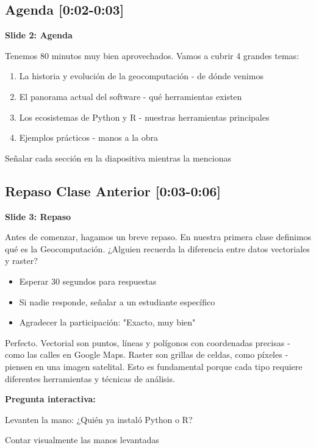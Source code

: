 \documentclass[11pt,a4paper]{article}
\newcommand{\tiempo}[1]{\textcolor{timecolor}{\faIcon{clock} \textbf{[#1]}}}
\newcommand{\decir}[1]{\begin{tcolorbox}[colback=blue!5,colframe=usachblue,title={\faIcon{microphone} DECIR}]#1\end{tcolorbox}}
\newcommand{\hacer}[1]{\begin{tcolorbox}[colback=green!5,colframe=green!50!black,title={\faIcon{hand-point-right} HACER}]#1\end{tcolorbox}}
\newcommand{\nota}[1]{\begin{tcolorbox}[colback=yellow!10,colframe=orange,title={\faIcon{sticky-note} NOTA}]#1\end{tcolorbox}}
\begin{document}
\subsection{Agenda \tiempo{0:02-0:03}}

\textbf{Slide 2: Agenda}

\decir{Tenemos 80 minutos muy bien aprovechados. Vamos a cubrir 4 grandes temas:
\begin{enumerate}
    \item La historia y evolución de la geocomputación - de dónde venimos
    \item El panorama actual del software - qué herramientas existen
    \item Los ecosistemas de Python y R - nuestras herramientas principales
    \item Ejemplos prácticos - manos a la obra
\end{enumerate}
}

\nota{Señalar cada sección en la diapositiva mientras la mencionas}

\subsection{Repaso Clase Anterior \tiempo{0:03-0:06}}

\textbf{Slide 3: Repaso}

\decir{Antes de comenzar, hagamos un breve repaso. En nuestra primera clase definimos qué es la Geocomputación. ¿Alguien recuerda la diferencia entre datos vectoriales y raster?}

\hacer{
\begin{itemize}
    \item Esperar 30 segundos para respuestas
    \item Si nadie responde, señalar a un estudiante específico
    \item Agradecer la participación: "Exacto, muy bien"
\end{itemize}
}

\decir{Perfecto. Vectorial son puntos, líneas y polígonos con coordenadas precisas - como las calles en Google Maps. Raster son grillas de celdas, como píxeles - piensen en una imagen satelital. Esto es fundamental porque cada tipo requiere diferentes herramientas y técnicas de análisis.}

\textbf{Pregunta interactiva:}

\decir{Levanten la mano: ¿Quién ya instaló Python o R?}

\hacer{Contar visualmente las manos levantadas}
\end{document}
